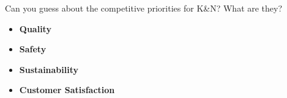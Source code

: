 \documentclass[addpoints]{exam}
\begin{document}
\begin{sloppypar}
\begin{questions}
    \question Can you guess about the competitive priorities for K\&N? What are they?
    \begin{solution}
        \begin{itemize}
            \item \textbf{Quality}
            \item \textbf{Safety}
            \item \textbf{Sustainability}
            \item \textbf{Customer Satisfaction}
        \end{itemize}
    \end{solution}

\end{questions}
\end{sloppypar}
\end{document}
